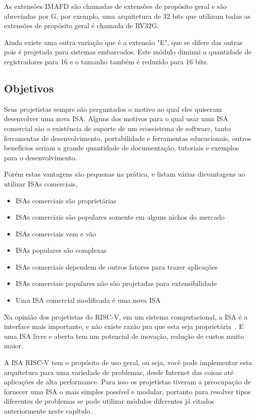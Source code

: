 	As extensões IMAFD são chamadas de extensões de propósito geral e são abreviadas por G, por exemplo, uma arquitetura de 32 bits que utilizam todas as extensões de propósito geral é chamada de RV32G.

	Ainda existe uma outra variação que é a extensão "E", que se difere das outras pois é projetada para sistemas embarcados. Este módulo diminui a quantidade de registradores para 16 e o tamanho também é reduzido para 16 bits.

	\subsection{Objetivos}

		Seus projetistas sempre são perguntados o motivo ao qual eles quiseram desenvolver uma nova ISA. Alguns dos motivos para o qual usar uma ISA comercial são a existência de suporte de um ecossistema de software, tanto ferramentas de desenvolvimento, portabilidade e ferramentas educacionais, outros benefícios seriam a grande quantidade de documentação, tutoriais e exemplos para o desenvolvimento.

		Porém estas vantagens são pequenas na prática, e listam várias disvantagens ao utilizar ISAs comerciais,

		\begin{itemize}
			\item ISAs comerciais são proprietárias
			\item ISAs comerciais são populares somente em alguns nichos do mercado
			\item ISAs comerciais vem e vão
			\item ISAs populares são complexas
			\item ISAs comerciais dependem de outros fatores para trazer aplicações
			\item ISAs comerciais populares não são projetadas para extensibilidade
			\item Uma ISA comercial modificada é uma nova ISA
		\end{itemize}

		Na opinião dos projetistas do RISC-V, em um sistema computacional, a ISA é a interface mais importante, e não existe razão pra que esta seja proprietária~\cite{Waterman:EECS-2016-1}. E uma ISA livre e aberta tem um potencial de inovação, redução de custos muito maior. 

		A ISA RISC-V tem o propósito de uso geral, ou seja, você pode implementar esta arquitetura para uma variedade de problemas, desde Internet das coisas até aplicações de alta performance. Para isso os projetistas tiveram a preocupação de fornecer uma ISA o mais simples possível e modular, portanto para resolver tipos diferentes de problemas se pode utilizar módulos diferentes já citados anteriormente neste capítulo.

